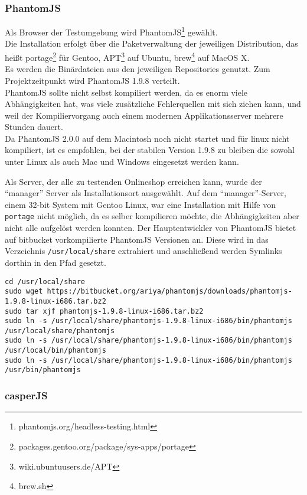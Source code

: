\subsubsection{PhantomJS}\label{phantomjs}

Als Browser der Testumgebung wird PhantomJS\footnote{phantomjs.org/headless-testing.html}
gewählt.\\Die Installation erfolgt über die Paketverwaltung der
jeweiligen Distribution, das heißt portage\footnote{packages.gentoo.org/package/sys-apps/portage}
für Gentoo, APT\footnote{wiki.ubuntuusers.de/APT} auf Ubuntu,
brew\footnote{brew.sh} auf MacOS X.\\Es werden die Binärdateien aus den
jeweiligen Repositories genutzt. Zum Projektzeitpunkt wird PhantomJS
1.9.8 verteilt.\\PhantomJS sollte nicht selbst kompiliert werden, da es
enorm viele Abhängigkeiten hat, was viele zusätzliche Fehlerquellen mit
sich ziehen kann, und weil der Kompiliervorgang auch einem modernen
Applikationsserver mehrere Stunden dauert.\\Da PhantomJS 2.0.0 auf dem
Macintosh noch nicht startet und für linux nicht kompiliert, ist es
empfohlen, bei der stabilen Version 1.9.8 zu bleiben die sowohl unter
Linux als auch Mac und Windows eingesetzt werden kann.

Als Server, der alle zu testenden Onlineshop erreichen kann, wurde der
``manager'' Server als Installationsort ausgewählt. Auf dem
``manager''-Server, einem 32-bit System mit Gentoo Linux, war eine
Installation mit Hilfe von \texttt{portage} nicht möglich, da es selber
kompilieren möchte, die Abhängigkeiten aber nicht alle aufgelöst werden
konnten. Der Hauptentwickler von PhantomJS bietet auf bitbucket
vorkompilierte PhantomJS Versionen an. Diese wird in das Verzeichnis
\texttt{/usr/local/share} extrahiert und anschließend werden Symlinks
dorthin in den Pfad gesetzt.

\begin{verbatim}
cd /usr/local/share
sudo wget https://bitbucket.org/ariya/phantomjs/downloads/phantomjs-1.9.8-linux-i686.tar.bz2
sudo tar xjf phantomjs-1.9.8-linux-i686.tar.bz2
sudo ln -s /usr/local/share/phantomjs-1.9.8-linux-i686/bin/phantomjs /usr/local/share/phantomjs
sudo ln -s /usr/local/share/phantomjs-1.9.8-linux-i686/bin/phantomjs /usr/local/bin/phantomjs
sudo ln -s /usr/local/share/phantomjs-1.9.8-linux-i686/bin/phantomjs /usr/bin/phantomjs
\end{verbatim}

\subsubsection{casperJS}\label{casperjs}

